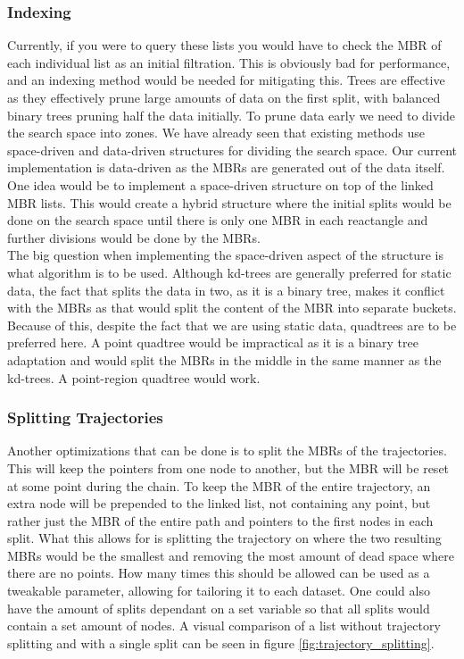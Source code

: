 \subsubsection{Indexing}
Currently, if you were to query these lists you would have to check the MBR of each individual list as an initial filtration. This is obviously bad for performance, and an indexing method would be needed for mitigating this. Trees are effective as they effectively prune large amounts of data on the first split, with balanced binary trees pruning half the data initially. To prune data early we need to divide the search space into zones. We have already seen that existing methods use space-driven and data-driven structures for dividing the search space. Our current implementation is data-driven as the MBRs are generated out of the data itself. One idea would be to implement a space-driven structure on top of the linked MBR lists. This would create a hybrid structure where the initial splits would be done on the search space until there is only one MBR in each reactangle and further divisions would be done by the MBRs. \\

The big question when implementing the space-driven aspect of the structure is what algorithm is to be used. Although kd-trees are generally preferred for static data, the fact that splits the data in two, as it is a binary tree, makes it conflict with the MBRs as that would split the content of the MBR into separate buckets. Because of this, despite the fact that we are using static data, quadtrees are to be preferred here. A point quadtree would be impractical as it is a binary tree adaptation and would split the MBRs in the middle in the same manner as the kd-trees. A point-region quadtree would work.

\subsubsection{Splitting Trajectories}
Another optimizations that can be done is to split the MBRs of the trajectories. This will keep the pointers from one node to another, but the MBR will be reset at some point during the chain. To keep the MBR of the entire trajectory, an extra node will be prepended to the linked list, not containing any point, but rather just the MBR of the entire path and pointers to the first nodes in each split. What this allows for is splitting the trajectory on where the two resulting MBRs would be the smallest and removing the most amount of dead space where there are no points. How many times this should be allowed can be used as a tweakable parameter, allowing for tailoring it to each dataset. One could also have the amount of splits dependant on a set variable so that all splits would contain a set amount of nodes.  A visual comparison of a list without trajectory splitting and with a single split can be seen in figure \ref{fig:trajectory_splitting}.

